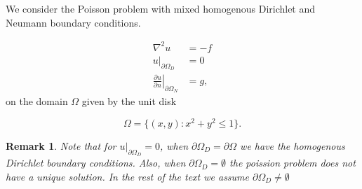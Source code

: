 \documentclass[5pt,a4paper,english]{elsarticle}%
\newcommand{\restr}[2]{\ensuremath{\left.#1\right|_{#2}}}
\newtheorem*{remark}{Remark}
\begin{document}
We consider the Poisson problem with mixed homogenous Dirichlet and Neumann boundary conditions. 

\begin{equation}
\begin{aligned}
    \nabla^2 u &= - f \\
    \restr{u}{\partial \Omega_{D}}  &= 0 \\
    \restr{\frac{\partial u}{\partial n}}{\partial \Omega_{N}} &= g,
\label{poission-problem}
\end{aligned}
\end{equation}
on the domain $\Omega$ given by the unit disk

\begin{equation*}
    \Omega = \{(x,y) : x^2+ y^2 \leq 1 \}.
\end{equation*}
\begin{remark}
Note that for $\restr{u}{\partial \Omega_D} = 0$, when $\partial \Omega_{D} = \partial \Omega$ we have the homogenous Dirichlet boundary conditions. Also, when $\partial \Omega_D = \emptyset$ the poission problem does not have a unique solution. In the rest of the text we assume $\partial \Omega_D \neq \emptyset$ 
\end{remark}
\end{document}
